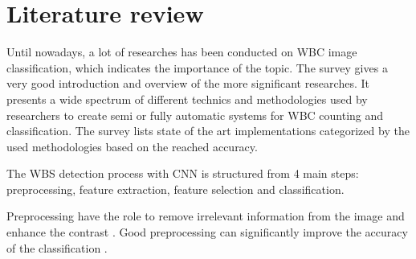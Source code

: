 \section{Literature review}
Until nowadays, a lot of researches has been conducted on WBC image classification, which indicates the importance of the topic.
The 
survey gives a very good introduction and overview of the more significant researches. It presents a wide spectrum of different technics and methodologies used by researchers to create semi or fully automatic systems for WBC counting and classification. The survey lists state of the art implementations categorized by the used methodologies based on the reached accuracy.

The WBS detection process with CNN is structured from 4 main steps: preprocessing, feature extraction, feature selection and classification.

Preprocessing have the role to remove irrelevant information from the image and enhance the contrast 
. Good preprocessing can significantly improve the accuracy of the classification 
.

